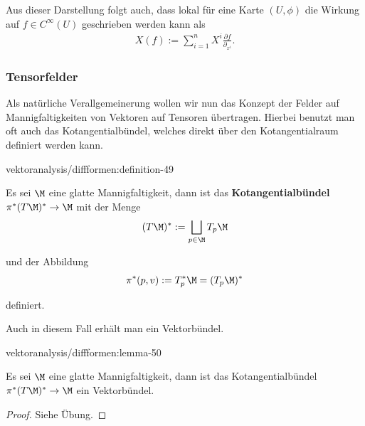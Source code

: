 \documentclass[letterpaper,10pt,english]{jupyterBook}
\begin{document}
\par
Aus dieser Darstellung folgt auch, dass lokal für eine Karte \((U,\phi)\) die Wirkung auf \(f\in C^\infty(U)\) geschrieben werden kann als
\begin{align*}
X(f) := \sum_{i=1}^n X^i \frac{\partial f}{\partial_{x^i}}.
\end{align*}

\subsubsection{Tensorfelder}
\label{\detokenize{vektoranalysis/diffformen:tensorfelder}}
\par
Als natürliche Verallgemeinerung wollen wir nun das Konzept der Felder auf Mannigfaltigkeiten von Vektoren auf Tensoren übertragen. Hierbei benutzt man oft auch das Kotangentialbündel, welches direkt über den Kotangentialraum definiert werden kann.
\begin{definition}{}{vektoranalysis/diffformen:definition-49}



\par
Es sei \(\M\) eine glatte Mannigfaltigkeit, dann ist das \textbf{Kotangentialbündel} \(\pi^\ast (T\M)^\ast\to\M\) mit der Menge
\begin{align*}
(T\M)^\ast := \bigsqcup_{p\in\M} T_p\M
\end{align*}
\par
und der Abbildung
\begin{align*}
\pi^{\ast}(p , v):= T_p^\ast\M = (T_p\M)^\ast
\end{align*}
\par
definiert.
\end{definition}

\par
Auch in diesem Fall erhält man ein Vektorbündel.
\begin{lemma}{}{vektoranalysis/diffformen:lemma-50}



\par
Es sei \(\M\) eine glatte Mannigfaltigkeit, dann ist das Kotangentialbündel \(\pi^\ast (T\M)^\ast\to\M\) ein Vektorbündel.
\end{lemma}

\begin{proof}
 Siehe Übung.
\end{proof}
\end{document}
